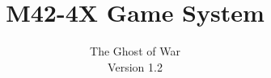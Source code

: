 \documentclass[parskip]{scrartcl}
\begin{document}
 
 
\title{M42-4X Game System}
\author{The Ghost of War \\Version 1.2}

\maketitle







 
 
\end{document}
